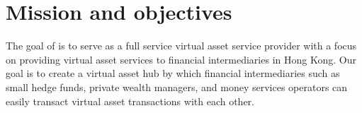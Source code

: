 \chapter{Mission and objectives}

The goal of \firmfullname is to serve as a full service virtual asset
service provider with a focus on providing virtual asset services to
financial intermediaries in Hong Kong.  Our goal is to create a
virtual asset hub by which financial intermediaries such as small
hedge funds, private wealth managers, and money services operators can
easily transact virtual asset transactions with each other.

